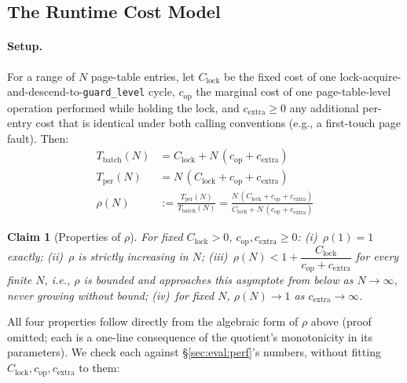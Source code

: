 \documentclass[10pt]{article}
\newtheorem{claim}{Claim}
\newcommand{\vfn}[1]{\texttt{#1}}
\begin{document}
\subsection{The Runtime Cost Model}
\label{sec:theory:runtime}

\paragraph{Setup.} For a range of $N$ page-table entries, let
$C_{\mathrm{lock}}$ be the fixed cost of one lock-acquire-and-descend-to-\vfn{guard\_level}
cycle, $c_{\mathrm{op}}$ the marginal cost of one page-table-level
operation performed while holding the lock, and $c_{\mathrm{extra}}
\geq 0$ any additional per-entry cost that is identical under both
calling conventions (e.g., a first-touch page fault). Then:
\begin{align}
T_{\mathrm{batch}}(N) &= C_{\mathrm{lock}} + N\,(c_{\mathrm{op}} + c_{\mathrm{extra}}) \\
T_{\mathrm{per}}(N)   &= N\,(C_{\mathrm{lock}} + c_{\mathrm{op}} + c_{\mathrm{extra}}) \\
\rho(N) &:= \frac{T_{\mathrm{per}}(N)}{T_{\mathrm{batch}}(N)}
  = \frac{N\,(C_{\mathrm{lock}} + c_{\mathrm{op}} + c_{\mathrm{extra}})}
         {C_{\mathrm{lock}} + N\,(c_{\mathrm{op}} + c_{\mathrm{extra}})}
\end{align}

\begin{claim}[Properties of $\rho$]
\label{claim:rho}
For fixed $C_{\mathrm{lock}} > 0$, $c_{\mathrm{op}}, c_{\mathrm{extra}}
\geq 0$: (i)~$\rho(1) = 1$ exactly; (ii)~$\rho$ is strictly increasing
in $N$; (iii)~$\rho(N) < 1 + \dfrac{C_{\mathrm{lock}}}{c_{\mathrm{op}} +
c_{\mathrm{extra}}}$ for every finite $N$, i.e., $\rho$ is bounded and
approaches this asymptote from below as $N \to \infty$, never growing
without bound; (iv)~for fixed $N$, $\rho(N) \to 1$ as $c_{\mathrm{extra}}
\to \infty$.
\end{claim}

All four properties follow directly from the algebraic form of $\rho$
above (proof omitted; each is a one-line consequence of the quotient's
monotonicity in its parameters). We check each against
\S\ref{sec:eval:perf}'s numbers, without fitting
$C_{\mathrm{lock}}, c_{\mathrm{op}}, c_{\mathrm{extra}}$ to them:
\end{document}
